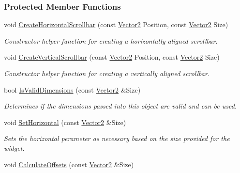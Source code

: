 \subsubsection*{Protected Member Functions}
\begin{DoxyCompactItemize}
\item 
void \hyperlink{classphys_1_1UI_1_1Scrollbar_af1d5ab4a11a71a1d0c5e6feb4cc88843}{CreateHorizontalScrollbar} (const \hyperlink{classphys_1_1Vector2}{Vector2} Position, const \hyperlink{classphys_1_1Vector2}{Vector2} Size)
\begin{DoxyCompactList}\small\item\em Constructor helper function for creating a horizontally aligned scrollbar. \item\end{DoxyCompactList}\item 
void \hyperlink{classphys_1_1UI_1_1Scrollbar_a337378d76c9d1c05606c0498e16dac4d}{CreateVerticalScrollbar} (const \hyperlink{classphys_1_1Vector2}{Vector2} Position, const \hyperlink{classphys_1_1Vector2}{Vector2} Size)
\begin{DoxyCompactList}\small\item\em Constructor helper function for creating a vertically aligned scrollbar. \item\end{DoxyCompactList}\item 
bool \hyperlink{classphys_1_1UI_1_1Scrollbar_a4953ac8c0b711ed9c1be468897e09ce8}{IsValidDimensions} (const \hyperlink{classphys_1_1Vector2}{Vector2} \&Size)
\begin{DoxyCompactList}\small\item\em Determines if the dimensions passed into this object are valid and can be used. \item\end{DoxyCompactList}\item 
void \hyperlink{classphys_1_1UI_1_1Scrollbar_acb5622bfb508d54f7802811e5dda4704}{SetHorizontal} (const \hyperlink{classphys_1_1Vector2}{Vector2} \&Size)
\begin{DoxyCompactList}\small\item\em Sets the horizontal perameter as necessary based on the size provided for the widget. \item\end{DoxyCompactList}\item 
void \hyperlink{classphys_1_1UI_1_1Scrollbar_a4621d6713a059196f1a358a23b9ad5ae}{CalculateOffsets} (const \hyperlink{classphys_1_1Vector2}{Vector2} \&Size)

\end{DoxyCompactItemize}
